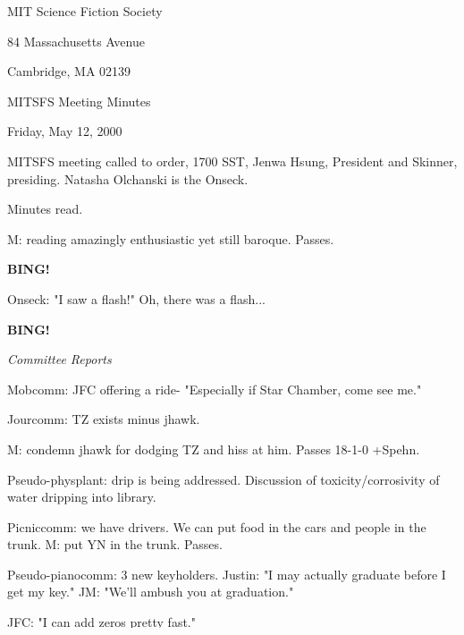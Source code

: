 \documentclass[12pt]{article}
\newcommand{\bing}{{\bf BING!} }
\newcommand{\goto}[1]{\bing \vskip 12pt \centerline{{\em{#1}}}}
\begin{document}
\begin{center}

MIT Science Fiction Society 

84 Massachusetts Avenue

Cambridge, MA 02139

\vspace{12pt}

MITSFS Meeting Minutes 

Friday, May 12, 2000

\end{center}
 
\vspace{18pt}

\setlength{\parskip}{6pt}

\noindent
MITSFS meeting called to order, 1700 SST, Jenwa Hsung, President and
Skinner, presiding.  Natasha Olchanski is the Onseck.

Minutes read.

M: reading amazingly enthusiastic yet still baroque. Passes.

\bing

Onseck: "I saw a flash!" Oh, there was a flash...

\goto{Committee Reports}

Mobcomm: JFC offering a ride- "Especially if Star Chamber, come see me."

Jourcomm: TZ exists minus jhawk.

M: condemn jhawk for dodging TZ and hiss at him. Passes 18-1-0 +Spehn.

Pseudo-physplant: drip is being addressed. Discussion of toxicity/corrosivity of water dripping into library.

Picniccomm: we have drivers. We can put food in the cars and people in the trunk. M: put YN in the trunk. Passes.

Pseudo-pianocomm: 3 new keyholders. Justin: "I may actually graduate before I get my key." JM: "We'll ambush you at graduation."

JFC: "I can add zeros pretty fast."

JM: "If you check out a whole pageful of books at a time you'll get a lot of fines."

Jade: "I'm allergic to boring discussions." 8-8-8 +Spehn. (8 times.)

Moocomm: Battlefield Earth is worse than Plan 9 from Outer Space according to NY Times.

\goto{Old Business}

J: last chance to get a permanent membership with all the advantages associated from Jenwa.
\end{document}
